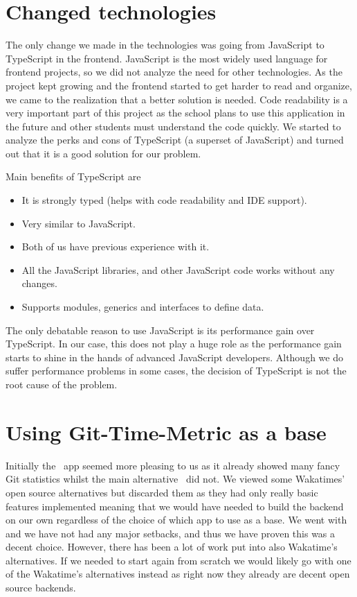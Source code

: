 \section{Changed technologies}\label{sec:changed-technologies}
The only change we made in the technologies was going from JavaScript to TypeScript in the frontend.
JavaScript is the most widely used language for frontend projects, so we did not analyze the need for other technologies.
As the project kept growing and the frontend started to get harder to read and organize, we came to the realization that a better solution is needed.
Code readability is a very important part of this project as the school plans to use this application in the future and other students must understand the code quickly.
We started to analyze the perks and cons of TypeScript (a superset of JavaScript) and turned out that it is a good solution for our problem.

Main benefits of TypeScript are
\begin{itemize}
    \item It is strongly typed (helps with code readability and IDE support).
    \item Very similar to JavaScript.
    \item Both of us have previous experience with it.
    \item All the JavaScript libraries, and other JavaScript code works without any changes.
    \item Supports modules, generics and interfaces to define data.
\end{itemize}

The only debatable reason to use JavaScript is its performance gain over TypeScript.
In our case, this does not play a huge role as the performance gain starts to shine in the hands of advanced JavaScript developers.
Although we do suffer performance problems in some cases, the decision of TypeScript is not the root cause of the problem.

\section{Using Git-Time-Metric as a base}\label{sec:using-git-time-metric-base}
Initially the~ app seemed more pleasing to us as it already showed many fancy Git statistics whilst
the main alternative~ did not.
We viewed some Wakatimes' open source alternatives but discarded them as they had only really basic features implemented meaning that
we would have needed to build the backend on our own regardless of the choice of which app to use as a base.
We went with~ and we have not had any major setbacks, and thus we have proven this was a decent choice.
However, there has been a lot of work put into also Wakatime's alternatives.
If we needed to start again from scratch we would likely go with one of the Wakatime's alternatives instead as right now
they already are decent open source backends.


